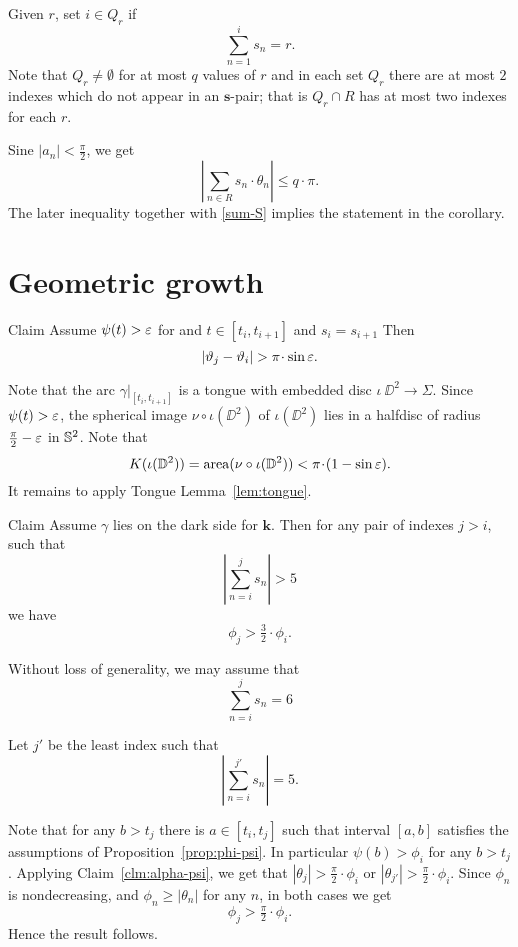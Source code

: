 \documentclass[a4paper,10pt]{amsart}
\begin{document}
Given $r$, set $i\in Q_r$ 
if
\[\sum_{n=1}^is_n=r.\]
Note that $Q_r\ne\emptyset$ for at most $q$ values of $r$
and in each set $Q_r$ there are at most $2$ indexes 
which do not appear in an $\bm{s}$-pair;
that is $Q_r\cap R$ has at most two indexes for each $r$.

Sine $|a_n|<\tfrac\pi2$, we get
\[\left|\sum_{n\in R}s_n\cdot\theta_n\right|
\le
q\cdot\pi.
\]
The later inequality together with \ref{sum-S} implies the statement in the corollary.
\qeds



\section{Geometric growth}\label{sec:geometric-growth}

\begin{thm}{Claim}\label{clm:alpha-psi}
Assume $\psi(t)>\varepsilon$ for and $t\in[t_{i},t_{i+1}]$
and $s_i=s_{i+1}$
Then 
\[|\theta_j-\theta_i|>\pi\cdot\sin\eps.\] 
\end{thm}

Note that the arc $\gamma|_{[t_{i},t_{i+1}]}$ is a tongue with embedded disc $\iota\:\DD^2\to \Sigma$.
Since $\psi(t)>\varepsilon$, 
the spherical image $\nu\circ\iota(\DD^2)$ 
of $\iota(\DD^2)$ 
lies in a halfdisc of radius $\tfrac\pi2-\varepsilon$ in $\mathbb{S}^2$.
Note that
\[K(\iota(\DD^2))
=
\area(\nu\circ\iota(\DD^2))
<
\pi\cdot(1-\sin\eps).\]
It remains to apply Tongue Lemma~\ref{lem:tongue}.
\qeds



\begin{thm}{Claim}\label{clm:geometric-grouth}
Assume $\gamma$ lies on the dark side for $\bm{k}$.
Then for any pair of indexes $j>i$,
such that 
\[|\sum_{n=i}^{j}s_n|> 5\]
we have
\[\phi_j>\tfrac32\cdot\phi_i.\]
\end{thm}


Without loss of generality, we may assume that 
\[\sum_{n=i}^{j}s_n= 6\]

Let $j'$ be the least index 
such that
\[|\sum_{n=i}^{j'} s_n|=5.\]

Note that for any $b>t_j$ there is $a\in[t_i,t_j]$
such that interval $[a,b]$ satisfies the assumptions of Proposition~\ref{prop:phi-psi}.
In particular $\psi(b)>\phi_i$ for any $b>t_j$.
Applying Claim~\ref{clm:alpha-psi},
we get that $|\theta_j|>\tfrac\pi2\cdot \phi_i$ or 
$|\theta_{j'}|>\tfrac\pi2\cdot \phi_i$.
Since $\phi_n$ is nondecreasing,
and $\phi_n\ge |\theta_n|$ for any $n$,
in both cases we get
\[\phi_j>\tfrac\pi2\cdot \phi_i.\]
Hence the result follows.
\qeds
\end{document}
